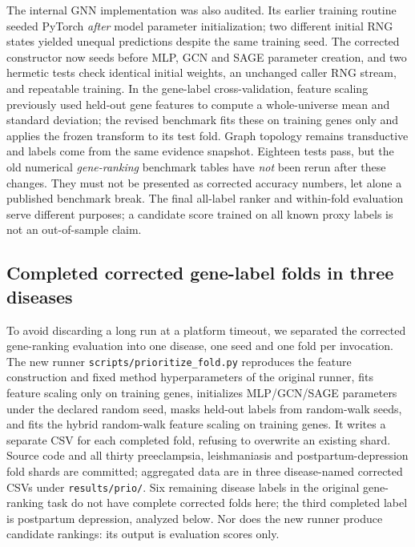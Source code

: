 \documentclass[11pt,a4paper]{article}
\begin{document}
The internal GNN implementation was also audited. Its earlier training routine seeded PyTorch \emph{after} model parameter initialization; two different initial RNG states yielded unequal predictions despite the same training seed. The corrected constructor now seeds before MLP, GCN and SAGE parameter creation, and two hermetic tests check identical initial weights, an unchanged caller RNG stream, and repeatable training. In the gene-label cross-validation, feature scaling previously used held-out gene features to compute a whole-universe mean and standard deviation; the revised benchmark fits these on training genes only and applies the frozen transform to its test fold. Graph topology remains transductive and labels come from the same evidence snapshot. Eighteen tests pass, but the old numerical \emph{gene-ranking} benchmark tables have \emph{not} been rerun after these changes. They must not be presented as corrected accuracy numbers, let alone a published benchmark break. The final all-label ranker and within-fold evaluation serve different purposes; a candidate score trained on all known proxy labels is not an out-of-sample claim.



\subsection{Completed corrected gene-label folds in three diseases}
To avoid discarding a long run at a platform timeout, we separated the corrected gene-ranking evaluation into one disease, one seed and one fold per invocation. The new runner \texttt{scripts/prioritize\_fold.py} reproduces the feature construction and fixed method hyperparameters of the original runner, fits feature scaling only on training genes, initializes MLP/GCN/SAGE parameters under the declared random seed, masks held-out labels from random-walk seeds, and fits the hybrid random-walk feature scaling on training genes. It writes a separate CSV for each completed fold, refusing to overwrite an existing shard. Source code and all thirty preeclampsia, leishmaniasis and postpartum-depression fold shards are committed; aggregated data are in three disease-named corrected CSVs under \texttt{results/prio/}. Six remaining disease labels in the original gene-ranking task do not have complete corrected folds here; the third completed label is postpartum depression, analyzed below. Nor does the new runner produce candidate rankings: its output is evaluation scores only.
\end{document}
